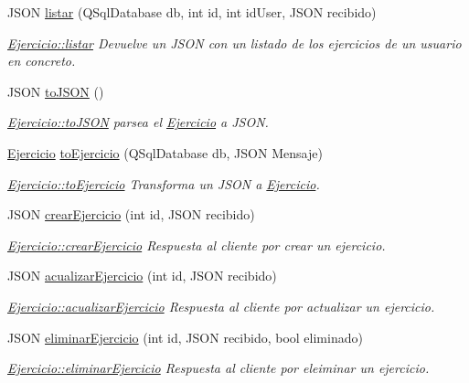 \begin{DoxyCompactItemize}
J\+S\+ON \mbox{\hyperlink{classEjercicio_a1b2d63f61871391ed1a8d3b47baff737}{listar}} (Q\+Sql\+Database db, int id, int id\+User, J\+S\+ON recibido)
\begin{DoxyCompactList}\small\item\em \mbox{\hyperlink{classEjercicio_a1b2d63f61871391ed1a8d3b47baff737}{Ejercicio\+::listar}} Devuelve un J\+S\+ON con un listado de los ejercicios de un usuario en concreto. \end{DoxyCompactList}\item 
J\+S\+ON \mbox{\hyperlink{classEjercicio_af4b3083a2d616daee78a5b39c62ff2be}{to\+J\+S\+ON}} ()
\begin{DoxyCompactList}\small\item\em \mbox{\hyperlink{classEjercicio_af4b3083a2d616daee78a5b39c62ff2be}{Ejercicio\+::to\+J\+S\+ON}} parsea el \mbox{\hyperlink{classEjercicio}{Ejercicio}} a J\+S\+ON. \end{DoxyCompactList}\item 
\mbox{\hyperlink{classEjercicio}{Ejercicio}} \mbox{\hyperlink{classEjercicio_a2a96cf1b169835e7fb9546765e11fbc6}{to\+Ejercicio}} (Q\+Sql\+Database db, J\+S\+ON Mensaje)
\begin{DoxyCompactList}\small\item\em \mbox{\hyperlink{classEjercicio_a2a96cf1b169835e7fb9546765e11fbc6}{Ejercicio\+::to\+Ejercicio}} Transforma un J\+S\+ON a \mbox{\hyperlink{classEjercicio}{Ejercicio}}. \end{DoxyCompactList}\item 
J\+S\+ON \mbox{\hyperlink{classEjercicio_a84f913ec55c51739867e7365b69684cb}{crear\+Ejercicio}} (int id, J\+S\+ON recibido)
\begin{DoxyCompactList}\small\item\em \mbox{\hyperlink{classEjercicio_a84f913ec55c51739867e7365b69684cb}{Ejercicio\+::crear\+Ejercicio}} Respuesta al cliente por crear un ejercicio. \end{DoxyCompactList}\item 
J\+S\+ON \mbox{\hyperlink{classEjercicio_a26572720af03b741e5e13a3a1a5b4dcc}{acualizar\+Ejercicio}} (int id, J\+S\+ON recibido)
\begin{DoxyCompactList}\small\item\em \mbox{\hyperlink{classEjercicio_a26572720af03b741e5e13a3a1a5b4dcc}{Ejercicio\+::acualizar\+Ejercicio}} Respuesta al cliente por actualizar un ejercicio. \end{DoxyCompactList}\item 
J\+S\+ON \mbox{\hyperlink{classEjercicio_ac6f014c19c08a8f010723fa60f736bf2}{eliminar\+Ejercicio}} (int id, J\+S\+ON recibido, bool eliminado)
\begin{DoxyCompactList}\small\item\em \mbox{\hyperlink{classEjercicio_ac6f014c19c08a8f010723fa60f736bf2}{Ejercicio\+::eliminar\+Ejercicio}} Respuesta al cliente por eleiminar un ejercicio. \end{DoxyCompactList}\end{DoxyCompactItemize}


